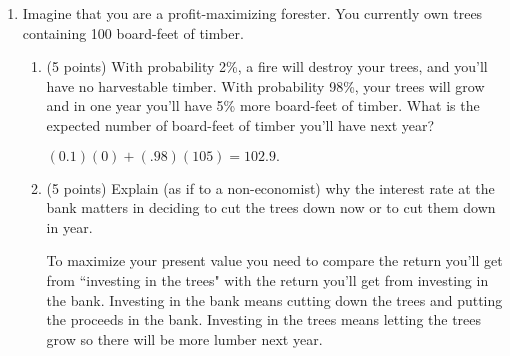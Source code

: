\documentclass[twoside]{article}
\begin{document}
\begin{enumerate}
\begin{enumerate}
    \item \begin{EXAM} (5 points) Use the analysis above to explain why many people spend hours deciding what kind of car to buy and only minutes deciding which presidential candidate to vote for.
    \vspace{1in} \end{EXAM}

\begin{KEY}
There is a very low probability that your vote will influence the outcome of the election, so the expected value from thinking about who to vote for can be very low even though the decision itself is very important.
\end{KEY}

    \end{enumerate}




\item \begin{EXAM} Imagine that you are a profit-maximizing forester. You currently own trees containing 100 board-feet of timber. \end{EXAM}

    \begin{enumerate}

    \item \begin{EXAM} (5 points) With probability 2\%, a fire will destroy your trees, and you'll have no harvestable timber. With probability 98\%, your trees will grow and in one year you'll have 5\% more board-feet of timber. What is the expected number of board-feet of timber you'll have next year? \vspace{2in} \end{EXAM}

\begin{KEY}
$(0.1)(0) + (.98)(105) = 102.9.$
\end{KEY}


    \item \begin{EXAM} (5 points) Explain (as if to a non-economist) why the interest rate at the bank matters in deciding to cut the trees down now or to cut them down in year.
 \vspace{1.3in}  \end{EXAM}

\begin{KEY}
To maximize your present value you need to compare the return you'll get from ``investing in the trees" with the return you'll get from investing in the bank. Investing in the bank means cutting down the trees and putting the proceeds in the bank. Investing in the trees means letting the trees grow so there will be more lumber next year.
\end{KEY}


\end{enumerate}
\end{enumerate}
\end{document}
